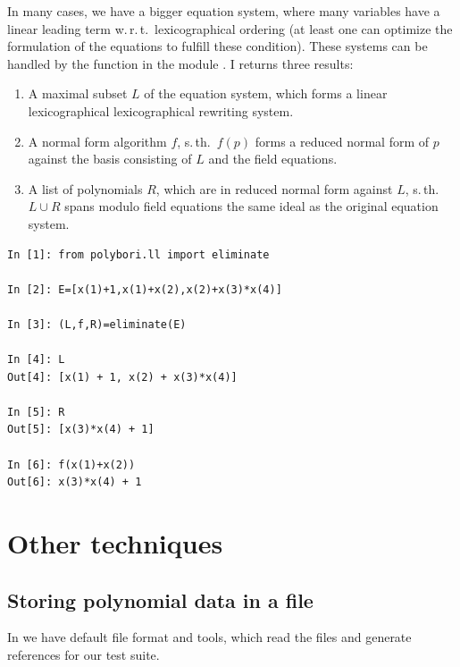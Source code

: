 In many cases, we have a bigger equation system, where many variables have a linear leading term w.\,r.\,t.\ lexicographical ordering (at least one can optimize the formulation of the equations to fulfill these condition).
%
These systems can be handled by the function  in the module .
I returns three results:
\begin{enumerate}
    \item A maximal subset $L$ of the equation system, which forms a linear lexicographical lexicographical rewriting system.
    \item A normal form algorithm $f$, s.\,th.\ $f(p)$ forms a reduced normal form of $p$ against the \Groebner basis consisting of $L$ and the field equations.
    \item A list of polynomials $R$, which are in reduced normal form against $L$, s.\,th.\ $L\cup R$ spans modulo field equations the same ideal as the original equation system.
\end{enumerate}

\begin{lstlisting}
In [1]: from polybori.ll import eliminate

In [2]: E=[x(1)+1,x(1)+x(2),x(2)+x(3)*x(4)]

In [3]: (L,f,R)=eliminate(E)

In [4]: L
Out[4]: [x(1) + 1, x(2) + x(3)*x(4)]

In [5]: R
Out[5]: [x(3)*x(4) + 1]

In [6]: f(x(1)+x(2))
Out[6]: x(3)*x(4) + 1
\end{lstlisting}
\section{Other techniques}
\subsection{Storing polynomial data in a file}

In \PolyBoRi we have default file format and tools, which read the files and generate references for our test suite.

